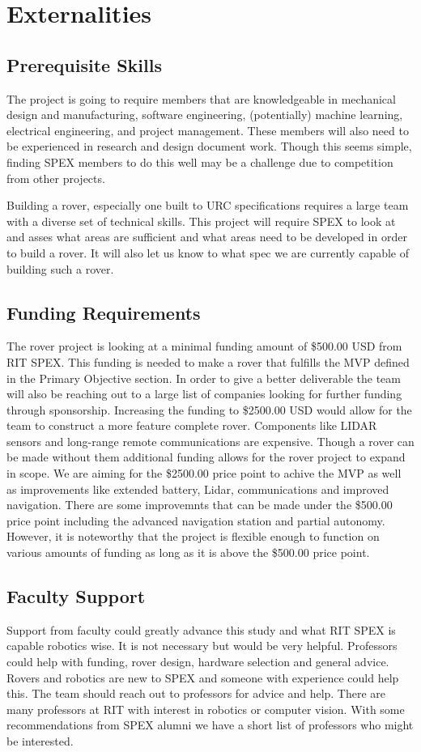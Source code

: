 \documentclass[conference]{IEEEtran} %
\begin{document}
\section{Externalities}
\subsection{Prerequisite Skills}
The project is going to require members that are knowledgeable in mechanical design and manufacturing, software engineering, (potentially) machine learning, electrical engineering, and project management. 
These members will also need to be experienced in research and design document work. 
Though this seems simple, finding SPEX members to do this well may be a challenge due to competition from other projects. 

Building a rover, especially one built to URC specifications requires a large team with a diverse set of technical skills. 
This project will require SPEX to look at and asses what areas are sufficient and what areas need to be developed in order to build a rover. 
It will also let us know to what spec we are currently capable of building such a rover. 

\subsection{Funding Requirements}
The rover project is looking at a minimal funding amount of \$500.00 USD from RIT SPEX. This funding is needed to make a rover that fulfills the MVP defined in the Primary Objective section. In order to give a better deliverable the team will also be reaching out to a large list of companies looking for further funding through sponsorship. 
Increasing the funding to \$2500.00 USD would allow for the team to construct a more feature complete rover. Components like LIDAR sensors and long-range remote communications are expensive. 
Though a rover can be made without them additional funding allows for the rover project to expand in scope. 
We are aiming for the \$2500.00 price point to achive the MVP as well as improvements like extended battery, Lidar, communications and improved navigation. 
There are some improvemnts that can be made under the \$500.00 price point including the advanced navigation station and partial autonomy.
However, it is noteworthy that the project is flexible enough to function on various amounts of funding as long as it is above the \$500.00 price point.

\subsection{Faculty Support}
Support from faculty could greatly advance this study and what RIT SPEX is capable robotics wise. 
It is not necessary but would be very helpful. 
Professors could help with funding, rover design, hardware selection and general advice. 
Rovers and robotics are new to SPEX and someone with experience could help this. 
The team should reach out to professors for advice and help. 
There are many professors at RIT with interest in robotics or computer vision. 
With some recommendations from SPEX alumni we have a short list of professors who might be interested. 
\end{document}
